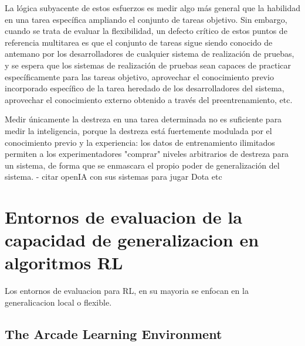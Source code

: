 La lógica subyacente de estos esfuerzos es medir algo más general que la habilidad en una tarea específica ampliando el conjunto de tareas objetivo. Sin embargo, cuando se trata de evaluar la flexibilidad, un defecto crítico de estos puntos de referencia multitarea es que el conjunto de tareas sigue siendo conocido de antemano por los desarrolladores de cualquier sistema de realización de pruebas, y se espera que los sistemas de realización de pruebas sean capaces de practicar específicamente para las tareas objetivo, aprovechar el conocimiento previo incorporado específico de la tarea heredado de los desarrolladores del sistema, aprovechar el conocimiento externo obtenido a través del preentrenamiento, etc.

Medir únicamente la destreza en una tarea determinada no es suficiente para medir la inteligencia, porque la destreza está fuertemente modulada por el conocimiento previo y la experiencia: los datos de entrenamiento ilimitados permiten a los experimentadores "comprar" niveles arbitrarios de destreza para un sistema, de forma que se enmascara el propio poder de generalización del sistema.
- citar openIA con sus sistemas para jugar Dota etc

\section{Entornos de evaluacion de la capacidad de generalizacion en algoritmos RL}\label{section:state-of-the-art:evaluation-enviroments-for-generalization-on-rl-algoritms}

Los entornos de evaluacion para RL, en su mayoria se enfocan en la generalicacion local o flexible.

\subsection{The Arcade Learning Environment}

